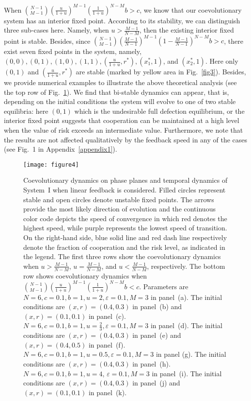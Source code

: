 \documentclass[9pt]{elife}
\begin{document}
When $\binom{N-1}{M-1}(\frac{u}{1+u})^{M-1}(\frac{1}{1+u})^{N-M} b>c$, we know that our coevolutionary system has an interior fixed point. According to its stability, we can distinguish three sub-cases here. Namely, when $u>\frac{M-1}{N-M}$, then the existing interior fixed point is stable. Besides, since $\binom{N-1}{M-1}(\frac{M-1}{N-1})^{M-1}(1-\frac{M-1}{N-1})^{N-M}b>c$, there exist seven fixed points in the system, namely, $(0, 0), (0, 1), (1 ,0), (1, 1), (\frac{u}{1+u},r^{*}), (x_{1}^{*},1)$, and $(x_{2}^{*},1)$. Here only $(0, 1)$ and $(\frac{u}{1+u},r^{*})$ are stable (marked by yellow area in Fig.~\ref{fig3}). Besides, we provide numerical examples to illustrate the above theoretical analysis (see the top row of Fig.~\ref{fig4}). We find that bi-stable dynamics can appear, that is, depending on the initial conditions the system will evolve to one of two stable equilibria: here $(0, 1)$ which is the undesirable full defection equilibrium, or the interior fixed point suggests that cooperation can be maintained at a high level when the value of risk exceeds an intermediate value. Furthermore, we note that the results are not affected qualitatively by the feedback speed in any of the cases (see Fig.~1 in Appendix~\ref{appendix1}).

\begin{figure}
\begin{fullwidth}
\hspace{0cm}\texttt{[image: figure4]}
\caption{Coevolutionary dynamics on phase planes and temporal dynamics of System~I when linear feedback is considered. Filled circles represent stable and open circles denote unstable fixed points. The arrows provide the most likely direction of evolution and the continuous color code depicts the speed of convergence in which red denotes the highest speed, while purple represents the lowest speed of transition. On the right-hand side, blue solid line and red dash line respectively denote the fraction of cooperation and the risk level, as indicated in the legend. The first three rows show the coevolutionary dynamics when $u>\frac{M-1}{N-M}$, $u=\frac{M-1}{N-M}$, and $u<\frac{M-1}{N-M}$, respectively. The bottom row shows coevolutionary dynamics when $\binom{N-1}{M-1}(\frac{u}{1+u})^{M-1}(\frac{1}{1+u})^{N-M}b<c$. Parameters are $N=6, c=0.1, b=1, u=2, \varepsilon=0.1, M=3$ in panel~(a). The initial conditions are $(x, r)=(0.4, 0.3)$ in panel~(b) and $(x, r)=(0.1, 0.1)$ in panel~(c). $N=6, c=0.1, b=1, u=\frac{2}{3}, \varepsilon=0.1, M=3$ in panel~(d). The initial conditions are $(x, r)=(0.4, 0.3)$ in panel~(e) and $(x, r)=(0.4, 0.5)$ in panel~(f). $N=6, c=0.1, b=1, u=0.5, \varepsilon=0.1, M=3$ in panel (g). The initial conditions are $(x, r)=(0.4, 0.3)$ in panel~(h). $N=6, c=0.1, b=1, u=4$, $\varepsilon=0.1, M=3$ in panel~(i). The initial conditions are $(x, r)=(0.4, 0.3)$ in panel~(j) and $(x, r)=(0.1, 0.1)$ in panel~(k).}
\label{fig4}
\end{fullwidth}
\end{figure}
\end{document}
